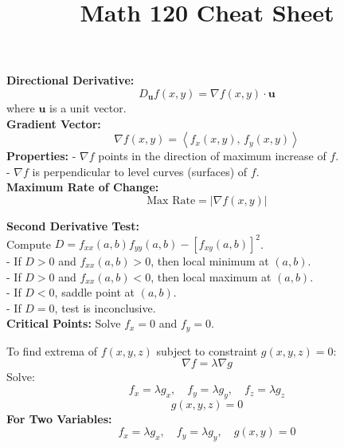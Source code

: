 \documentclass[2pt]{article}
\title{\small \textbf{Math 120 Cheat Sheet}} %
\date{} %
\begin{document}
\maketitle
\vspace{-10pt} %
\begin{multicols}{2}

\begin{tcolorbox}[title=\textbf{Directional Derivatives and Gradient Vector}, colframe=lightblue]
    \textbf{Directional Derivative:} 	
    \[ D_{\mathbf{u}} f(x, y) = \nabla f(x, y) \cdot \mathbf{u} \]
    where \( \mathbf{u} \) is a unit vector. \\
    \textbf{Gradient Vector:}
    \[ \nabla f(x, y) = \left\langle f_x(x, y), \, f_y(x, y) \right\rangle \]
    \textbf{Properties:}
    - \( \nabla f \) points in the direction of maximum increase of \( f \). \\
    - \( \nabla f \) is perpendicular to level curves (surfaces) of \( f \). \\
    \textbf{Maximum Rate of Change:}
    \[ \text{Max Rate} = |\nabla f(x, y)| \]
\end{tcolorbox}

\begin{tcolorbox}[title=\textbf{Maximum and Minimum Values}, colframe=lightgreen]
    \textbf{Second Derivative Test:} \\
    Compute \( D = f_{xx}(a,b) f_{yy}(a,b) - [f_{xy}(a,b)]^2 \). \\
    - If \( D > 0 \) and \( f_{xx}(a,b) > 0 \), then local minimum at \( (a, b) \). \\
    - If \( D > 0 \) and \( f_{xx}(a,b) < 0 \), then local maximum at \( (a, b) \). \\
    - If \( D < 0 \), saddle point at \( (a, b) \). \\
    - If \( D = 0 \), test is inconclusive. \\
    \textbf{Critical Points:} Solve \( f_x = 0 \) and \( f_y = 0 \).
\end{tcolorbox}

\begin{tcolorbox}[title=\textbf{Lagrange Multipliers}, colframe=lightpink]
    To find extrema of \( f(x, y, z) \) subject to constraint \( g(x, y, z) = 0 \):
    \[ \nabla f = \lambda \nabla g \]
    Solve:
    \[ f_x = \lambda g_x, \quad f_y = \lambda g_y, \quad f_z = \lambda g_z \]
    \[ g(x, y, z) = 0 \]
    \textbf{For Two Variables:}
    \[ f_x = \lambda g_x, \quad f_y = \lambda g_y, \quad g(x, y) = 0 \]
\end{tcolorbox}


\end{multicols}
\end{document}

